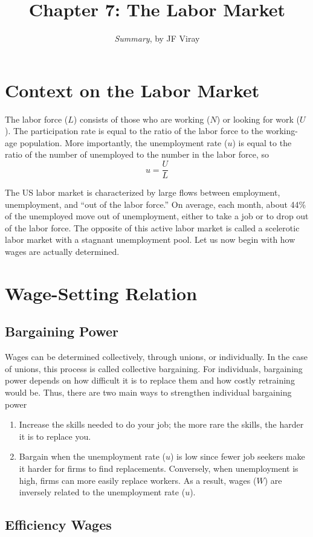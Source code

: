 \documentclass{extarticle}
\title{\vspace{-2em}Chapter 7: The Labor Market}
\author{\emph{Summary}, by JF Viray}
\date{}
\begin{document}
\maketitle

\section{Context on the Labor Market}
The labor force ($L$) consists of those who are working ($N$) or looking for work ($U$). The participation rate is equal to the ratio of the labor force to the working-age population. More importantly, the unemployment rate ($u$) is equal to the ratio of the number of unemployed to the number in the labor force, so
$$u = \frac{U}{L}$$

The US labor market is characterized by large flows between employment, unemployment, and “out of the labor force.”
On average, each month, about 44\% of the unemployed move out of unemployment, either to take a job or to drop out of the labor force. The opposite of this active labor market is called a scelerotic labor market with a stagnant unemployment pool. Let us now begin with how wages are actually determined. 
\section{Wage-Setting Relation}
\subsection{Bargaining Power}
Wages can be determined collectively, through unions, or individually. In the case of unions, this process is called collective bargaining. For individuals, bargaining power depends on how difficult it is to replace them and how costly retraining would be. Thus, there are two main ways to strengthen individual bargaining power
\begin{enumerate}
  \item Increase the skills needed to do your job; the more rare the skills, the harder it is to replace you.
  \item Bargain when the unemployment rate ($u$) is low since fewer job seekers make it harder for firms to find replacements. Conversely, when unemployment is high, firms can more easily replace workers. As a result, wages ($W$) are inversely related to the unemployment rate ($u$).
\end{enumerate}
\subsection{Efficiency Wages}
\end{document}
